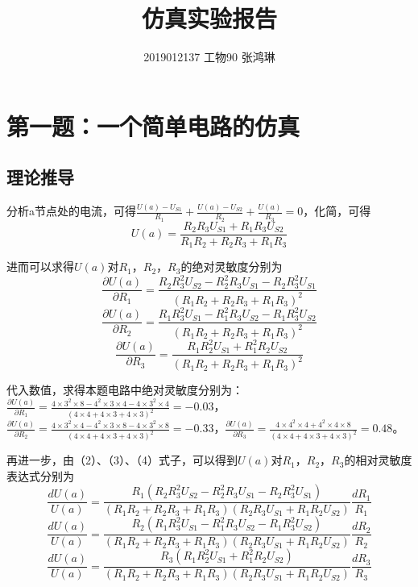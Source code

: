 \documentclass[UTF8]{ctexart}
\begin{document}
\title{仿真实验报告}
\author{2019012137  工物90  张鸿琳}
\maketitle

\tableofcontents
\newpage
\section{第一题：一个简单电路的仿真}
\subsection{理论推导}
分析a节点处的电流，可得$\frac{U(a)-U_{S1}}{R_1}+\frac{U(a)-U_{S2}}{R_2}+\frac{U(a)}{R_3}=0$，化简，可得
\begin{equation}
U(a)=\frac{R_2R_3U_{S1}+R_1R_3U_{S2}}{R_1R_2+R_2R_3+R_1R_3}
\end{equation}

进而可以求得$U(a)$对$R_1$，$R_2$，$R_3$的绝对灵敏度分别为
\begin{equation}
\frac{\partial U(a)}{\partial R_1}=\frac{R_2R_3^2U_{S2}-R_2^2R_3U_{S1}-R_2R_3^2U_{S1}}{(R_1R_2+R_2R_3+R_1R_3)^2}
\end{equation}
\begin{equation}
\frac{\partial U(a)}{\partial R_2}=\frac{R_1R_3^2U_{S1}-R_1^2R_3U_{S2}-R_1R_3^2U_{S2}}{(R_1R_2+R_2R_3+R_1R_3)^2}
\end{equation}
\begin{equation}
\frac{\partial U(a)}{\partial R_3}=\frac{R_1R_2^2U_{S1}+R_1^2R_2U_{S2}}{(R_1R_2+R_2R_3+R_1R_3)^2}
\end{equation}

代入数值，求得本题电路中绝对灵敏度分别为：$\frac{\partial U(a)}{\partial R_1}=\frac{4\times3^2\times8-4^2\times3\times4-4\times3^2\times4}{(4\times4+4\times3+4\times3)^2}=-0.03$，$\frac{\partial U(a)}{\partial R_2}=\frac{4\times3^2\times4-4^2\times3\times8-4\times3^2\times8}{(4\times4+4\times3+4\times3)^2}=-0.33$，$\frac{\partial U(a)}{\partial R_3}=\frac{4\times4^2\times4+4^2\times4\times8}{(4\times4+4\times3+4\times3)^2}=0.48$。

再进一步，由（2）、（3）、（4）式子，可以得到$U(a)$对$R_1$，$R_2$，$R_3$的相对灵敏度表达式分别为
\begin{equation}
\frac{dU(a)}{U(a)}=\frac{R_1(R_2R_3^2U_{S2}-R_2^2R_3U_{S1}-R_2R_3^2U_{S1})}{(R_1R_2+R_2R_3+R_1R_3)(R_2R_3U_{S1}+R_1R_2U_{S2})}\frac{dR_1}{R_1}
\end{equation}
\begin{equation}
\frac{dU(a)}{U(a)}=\frac{R_2(R_1R_3^2U_{S1}-R_1^2R_3U_{S2}-R_1R_3^2U_{S2})}{(R_1R_2+R_2R_3+R_1R_3)(R_2R_3U_{S1}+R_1R_2U_{S2})}\frac{dR_2}{R_2}
\end{equation}
\begin{equation}
\frac{dU(a)}{U(a)}=\frac{R_3(R_1R_2^2U_{S1}+R_1^2R_2U_{S2})}{(R_1R_2+R_2R_3+R_1R_3)(R_2R_3U_{S1}+R_1R_2U_{S2})}\frac{dR_3}{R_3}
\end{equation}
\end{document}
